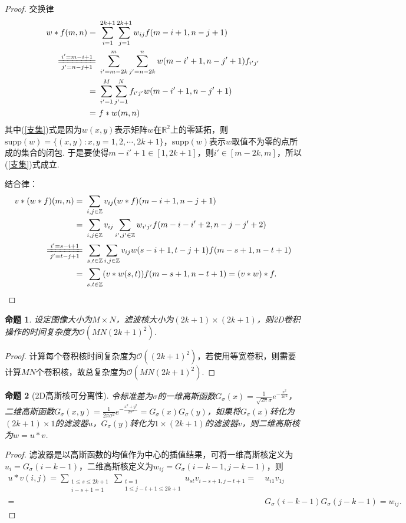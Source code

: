 \documentclass[12pt, a4paper, oneside]{ctexart}
\newtheorem{proposition}{命题}
\let\leq=\leqslant %
\def\R{\mathbb{R}}          %
\def\Z{\mathbb{Z}}          %
\def\i{\mathrm{i}}          %
\def\add{\vspace{1ex}}      %
\begin{document}
\begin{proof}交换律 \vspace{-1.5ex}
    \begin{align}
        \notag w*f(m, n) =&\ \sum_{i=1}^{2k+1}\sum_{j=1}^{2k+1}w_{ij}f(m-i+1,n-j+1)\\
        \notag \xlongequal[j' = n-j+1]{i' = m-i+1}&\ \sum_{i'=m-2k}^{m}\sum_{j'=n-2k}^{n}w(m-i'+1,n-j'+1)f_{i'j'}\\
        \label{支集}=&\ \sum_{i'=1}^{M}\sum_{j'=1}^{N}f_{i'j'}w(m-i'+1,n-j'+1)\\
        \notag =&\ f*w(m, n)
    \end{align}
    其中(\ref{支集})式是因为$w(x, y)$表示矩阵$w$在$\R^2$上的零延拓，则$\text{supp}(w) = \{(x, y):x, y = 1,2,\cdots, 2k+1\}$，$\text{supp}(w)$表示$w$取值不为零的点所成的集合的闭包. 于是要使得$m-i'+1\in[1, 2k+1]$，则$i'\in[m-2k, m]$，所以(\ref{支集})式成立.

    结合律：
    \begin{align*}
        v*(w*f)(m, n) =&\ \sum_{i,j\in\Z}v_{ij}(w*f)(m-i+1,n-j+1)\\
        =&\ \sum_{i,j\in\Z}v_{ij}\sum_{i',j'\in \Z}w_{i'j'}f(m-i-i'+2,n-j-j'+2)\\
        \xlongequal[j'=t-j+1]{i'=s-i+1}&\ \sum_{s,t\in\Z}\sum_{i,j\in\Z}v_{ij}w(s-i+1,t-j+1)f(m-s+1,n-t+1)\\
        =&\ \sum_{s,t\in\Z}(v*w(s,t))f(m-s+1,n-t+1) = (v*w)*f.
    \end{align*}
\end{proof}
\begin{proposition}
    设定图像大小为$M\times N$，滤波核大小为$(2k+1)\times (2k+1)$，则2D卷积操作的时间复杂度为$\mathcal{O}(MN(2k+1)^2)$.
\end{proposition}
\begin{proof}
    计算每个卷积核时间复杂度为$\mathcal{O}((2k+1)^2)$，若使用等宽卷积，则需要计算$MN$个卷积核，故总复杂度为$\mathcal{O}(MN(2k+1)^2)$.
\end{proof}
\begin{proposition}[2D高斯核可分离性]
    令标准差为$\sigma$的一维高斯函数$G_\sigma(x) = \frac{1}{\sqrt{2\pi}\sigma}e^{-\frac{x^2}{2\sigma^2}}$，二维高斯函数$G_\sigma(x, y) = \frac{1}{2\pi\sigma^2}e^{-\frac{x^2+y^2}{2\sigma^2}} = G_\sigma(x)G_\sigma(y)$，\add 如果将$G_\sigma(x)$转化为$(2k+1)\times 1$的滤波器$u$，$G_\sigma(y)$转化为$1\times (2k+1)$的滤波器$v$，则二维高斯核为$w = u*v$.
\end{proposition}
\begin{proof}
    滤波器是以高斯函数的均值作为中心的插值结果，可将一维高斯核定义为$u_i = G_\sigma(i-k-1)$，二维高斯核定义为$w_{ij} = G_\sigma(i-k-1,j-k-1)$，则
    \begin{align*}
        u*v(i,j) = \sum_{\substack{1\leq s\leq 2k+1\\i-s+1=1}}\sum_{\substack{t=1\\1\leq j-t+1\leq 2k+1}}u_{st}v_{i-s+1,j-t+1} =&\ u_{i1}v_{1j}\\
        =&\ G_\sigma(i-k-1)G_\sigma(j-k-1) = w_{ij}.
    \end{align*}
\end{proof}
\end{document}
